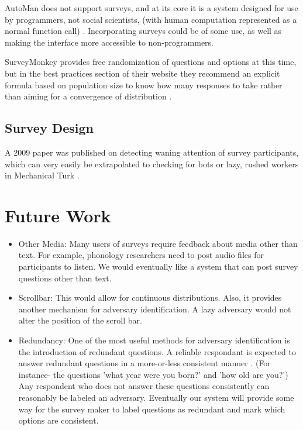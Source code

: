 \documentclass{article}
\begin{document}
AutoMan does not support surveys, and at its core it is a system designed for use by programmers, not social scientists, (with human computation represented as a normal function call) \cite{automan}. Incorporating surveys could be of some use, as well as making the interface more accessible to non-programmers.

SurveyMonkey provides free randomization of questions and options at this time, but in the best practices section of their website they recommend an explicit formula based on population size to know how many responses to take rather than aiming for a convergence of distribution \cite{surveymonkey_how_many}.
\subsection{Survey Design}
A 2009 paper was published on detecting waning attention of survey participants, which can very easily be extrapolated to checking for bots or lazy, rushed workers in Mechanical Turk \cite{satisficing}.
\section{Future Work}
\begin{itemize}
\item Other Media:  Many users of surveys require feedback about media other than text. For example, phonology researchers need to post audio files for participants to listen. We would eventually like a system that can post survey questions other than text.
\item Scrollbar: This would allow for continuous distributions. Also, it provides another mechanism for adversary identification. A lazy adversary would not alter the position of the scroll bar.
\item Redundancy: One of the most useful methods for adversary identification is the introduction of redundant questions. A reliable respondant is expected to answer redundant questions in a more-or-less consistent manner \cite{satisficing}. (For instance- the questions 'what year were you born?' and 'how old are you?') Any respondent who does not answer these questions consistently can reasonably be labeled an adversary. Eventually our system will provide some way for the survey maker to label questions as redundant and mark which options are consistent.
\end{itemize}


\end{document}
